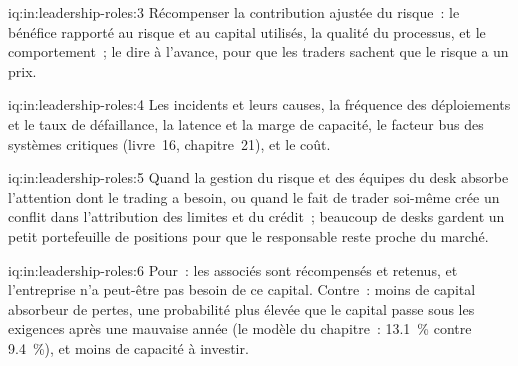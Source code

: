 \begin{solution}{iq:in:leadership-roles:3}
Récompenser la contribution ajustée du risque~: le bénéfice rapporté au risque et au capital utilisés, la qualité du processus, et le
comportement~; le dire à l'avance, pour que les traders sachent que le risque a un prix.
\end{solution}

\begin{solution}{iq:in:leadership-roles:4}
Les incidents et leurs causes, la fréquence des déploiements et le taux de défaillance, la latence et la marge de capacité, le facteur bus des
systèmes critiques (livre~16, chapitre~21), et le coût.
\end{solution}

\begin{solution}{iq:in:leadership-roles:5}
Quand la gestion du risque et des équipes du desk absorbe l'attention dont le trading a besoin, ou quand le fait de trader soi-même crée un conflit
dans l'attribution des limites et du crédit~; beaucoup de desks gardent un petit portefeuille de positions pour que le responsable reste proche du marché.
\end{solution}

\begin{solution}{iq:in:leadership-roles:6}
Pour~: les associés sont récompensés et retenus, et l'entreprise n'a peut-être pas besoin de ce capital. Contre~: moins de capital absorbeur de pertes, une
probabilité plus élevée que le capital passe sous les exigences après une mauvaise année (le modèle du chapitre~: 13.1~\% contre 9.4~\%), et
moins de capacité à investir.
\end{solution}
